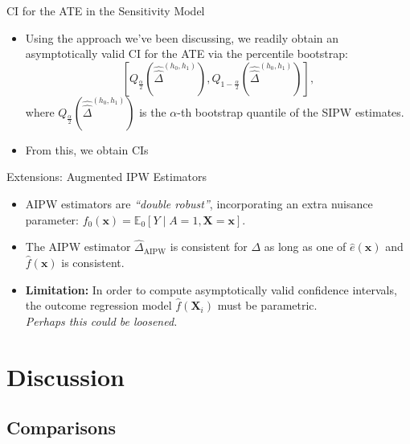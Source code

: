 \documentclass{beamer}
\newcommand{\E}{\mathbb{E}}
\begin{document}

\begin{frame}{CI for the ATE in the Sensitivity Model}

\begin{itemize}
  \itemsep12pt
  \item Using the approach we've been discussing, we readily obtain an
    asymptotically valid CI for the ATE via the percentile bootstrap:
    \[
      \left[Q_{\frac{\alpha}{2}}(\hat{\hat{\Delta}}^{(h_0, h_1)}),
      Q_{1 - \frac{\alpha}{2}}(\hat{\hat{\Delta}}^{(h_0, h_1)})\right],
    \]
    where $Q_{\frac{\alpha}{2}}(\hat{\hat{\Delta}}^{(h_0, h_1)})$ is the
    $\alpha$-th bootstrap quantile of the SIPW estimates.
  \item From this, we obtain CIs 
\end{itemize}

\end{frame}


\begin{frame}{Extensions: Augmented IPW Estimators}

\begin{itemize}
  \itemsep12pt
  \item AIPW estimators are \textit{``double robust''}, incorporating an extra
    nuisance parameter: $f_0(\bm{x}) = \E_0[Y \mid A = 1, \bm{X} = \bm{x}]$.
  \item The AIPW estimator $\hat{\Delta}_{\text{AIPW}}$ is consistent for
    $\Delta$ as long as one of $\hat{e}(\bm{x})$ and $\hat{f}(\bm{x})$ is
    consistent.
  \item \textbf{Limitation:} In order to compute asymptotically valid confidence
    intervals, the outcome regression model $\hat{f}(\bm{X}_i)$ must be
    parametric.\\ \pause
    \small{\textit{Perhaps this could be loosened.}}
\end{itemize}

\end{frame}

\section{Discussion}
\subsection{Comparisons}
\end{document}
